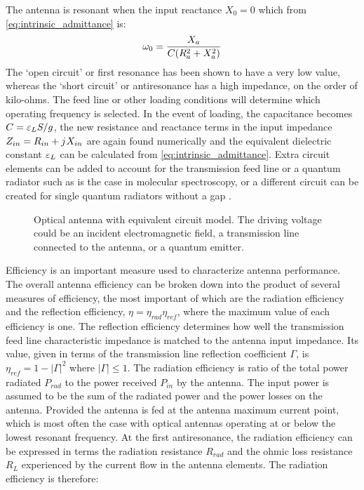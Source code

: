 The antenna is resonant when the input reactance $X_0 = 0$ which from \eqref{eq:intrinsic_admittance} is:
%
\begin{equation}
  \omega_{0} = \frac{X_a}{C  (R_a^2 + X_a^2)}
  \label{eq:resonant_frequency_impedance}
\end{equation}
%
The `open circuit' or first resonance has been shown to have a very low value, whereas the `short circuit' or antiresonance has a high impedance, on the order of kilo-ohms. The feed line or other loading conditions will determine which operating frequency is selected. In the event of loading, the capacitance becomes $C = \varepsilon_L S /g$, the new resistance and reactance terms in the input impedance $Z_{in} = R_{in} + j\mkern1mu X_{in}$ are again found numerically and the equivalent dielectric constant $\varepsilon_L$ can be calculated from \eqref{eq:intrinsic_admittance}. Extra circuit elements can be added to account for the transmission feed line or a quantum radiator such as is the case in molecular spectroscopy, or a different circuit can be created for single quantum radiators without a gap \cite{9781107014145}.
%
\begin{figure}[b!]
  \centering
  \def\svgwidth{.75\linewidth}
  
  \caption{Optical antenna with equivalent circuit model. The driving voltage could be an incident electromagnetic field, a transmission line connected to the antenna, or a quantum emitter.}
  \label{fig:alu_circuit}
\end{figure}
%
Efficiency is an important measure used to characterize antenna performance. The overall antenna efficiency can be broken down into the product of several measures of efficiency, the most important of which are the radiation efficiency and the reflection efficiency, $\eta  = \eta_{rad}\eta_{ref}$,
where the maximum value of each efficiency is one. The reflection efficiency determines how well the transmission feed line characteristic impedance is matched to the antenna input impedance. Its value, given in terms of the transmission line reflection coefficient $\Gamma$, is $\eta_{ref} = 1 - \left| \Gamma  \right|^2$ where $\left| \Gamma \right| \le 1$. The radiation efficiency is ratio of the total power radiated $P_{rad}$ to the power received $P_{in}$ by the antenna. The input power is assumed to be the sum of the radiated power and the power losses on the antenna. Provided the antenna is fed at the antenna maximum current point, which is most often the case with optical antennas operating at or below the lowest resonant frequency. At the first antiresonance, the radiation efficiency can be expressed in terms the radiation resistance $R_{rad}$ and the ohmic loss resistance $R_L$ experienced by the current flow in the antenna elements. The radiation efficiency is therefore:

